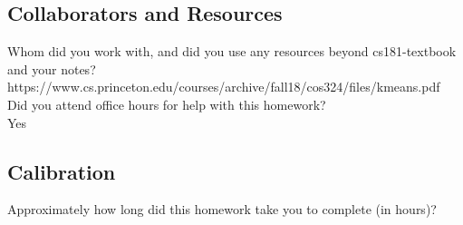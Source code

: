 \documentclass[submit]{harvardml}
\begin{document}
\subsection*{Collaborators and Resources}
Whom did you work with, and did you use any resources beyond cs181-textbook and your notes?\\
https://www.cs.princeton.edu/courses/archive/fall18/cos324/files/kmeans.pdf
\\
Did you attend office hours for help with this homework?\\
Yes
\subsection*{Calibration}
Approximately how long did this homework take you to complete (in hours)? 
\end{document}
